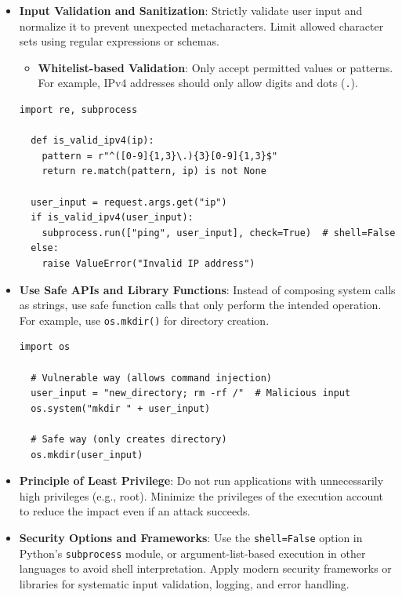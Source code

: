 \documentclass{article}
\begin{document}
\begin{itemize}
  \item \textbf{Input Validation and Sanitization}: Strictly validate user input and normalize it to prevent unexpected metacharacters. Limit allowed character sets using regular expressions or schemas.
  \begin{itemize}
  \item \textbf{Whitelist-based Validation}: Only accept permitted values or patterns. For example, IPv4 addresses should only allow digits and dots (\texttt{.}).
  \end{itemize}

  \begin{lstlisting}[caption={Python Example: IPv4 Input Validation and Safe Execution}]
  import re, subprocess

  def is_valid_ipv4(ip):
    pattern = r"^([0-9]{1,3}\.){3}[0-9]{1,3}$"
    return re.match(pattern, ip) is not None

  user_input = request.args.get("ip")
  if is_valid_ipv4(user_input):
    subprocess.run(["ping", user_input], check=True)  # shell=False
  else:
    raise ValueError("Invalid IP address")
  \end{lstlisting}

  \item \textbf{Use Safe APIs and Library Functions}: Instead of composing system calls as strings, use safe function calls that only perform the intended operation. For example, use \texttt{os.mkdir()} for directory creation.

  \begin{lstlisting}[caption={Unsafe vs. Safe Method}]
  import os

  # Vulnerable way (allows command injection)
  user_input = "new_directory; rm -rf /"  # Malicious input
  os.system("mkdir " + user_input)  

  # Safe way (only creates directory)
  os.mkdir(user_input)
  \end{lstlisting}

  \item \textbf{Principle of Least Privilege}: Do not run applications with unnecessarily high privileges (e.g., root). Minimize the privileges of the execution account to reduce the impact even if an attack succeeds.

  \item \textbf{Security Options and Frameworks}: Use the \texttt{shell=False} option in Python's \texttt{subprocess} module, or argument-list-based execution in other languages to avoid shell interpretation. Apply modern security frameworks or libraries for systematic input validation, logging, and error handling.
  

\end{itemize}
\end{document}
